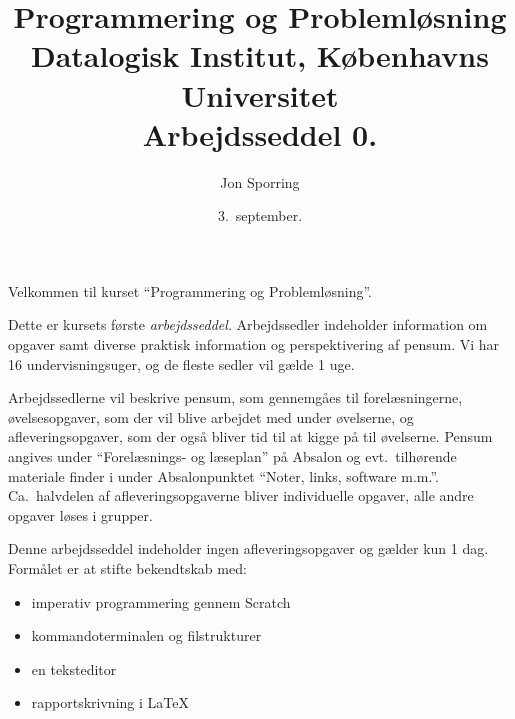 \documentclass[a4paper,12pt]{article}
\title{Programmering og Problemløsning\\Datalogisk Institut,
  Københavns Universitet\\Arbejdsseddel 0.}
\author{Jon Sporring}
\date{3.\ september.}
\begin{document}
\maketitle

Velkommen til kurset ``Programmering og Problemløsning''.

Dette er kursets første \emph{arbejdsseddel}. Arbejdssedler indeholder information om opgaver samt diverse praktisk information og perspektivering af pensum. Vi har 16 undervisningsuger, og de fleste sedler vil gælde 1 uge.

Arbejdssedlerne vil beskrive pensum, som gennemgåes til forelæsningerne, øvelsesopgaver, som der vil blive arbejdet med under øvelserne, og afleveringsopgaver, som der også bliver tid til at kigge på til øvelserne. Pensum angives under "`Forelæsnings- og læseplan"' på Absalon og evt.\ tilhørende materiale finder i under Absalonpunktet "`Noter, links, software m.m."'. Ca.\ halvdelen af afleveringsopgaverne bliver individuelle opgaver, alle andre opgaver løses i grupper.

Denne arbejdsseddel indeholder ingen afleveringsopgaver og gælder kun 1 dag. Formålet er at stifte bekendtskab med:
\begin{itemize}
\item imperativ programmering gennem Scratch
\item kommandoterminalen og filstrukturer
\item en teksteditor
\item rapportskrivning i LaTeX
\end{itemize}
\end{document}
